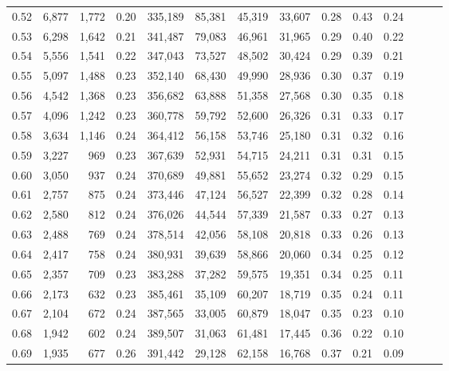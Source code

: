 \begin{tabular}{rrrrrrrrrrrrrr}
0.52 &   6,877 &  1,772 &  0.20 &  335,189 &   85,381 &  45,319 &  33,607 &  0.28 &  0.43 &      0.24 \\
0.53 &   6,298 &  1,642 &  0.21 &  341,487 &   79,083 &  46,961 &  31,965 &  0.29 &  0.40 &      0.22 \\
0.54 &   5,556 &  1,541 &  0.22 &  347,043 &   73,527 &  48,502 &  30,424 &  0.29 &  0.39 &      0.21 \\
0.55 &   5,097 &  1,488 &  0.23 &  352,140 &   68,430 &  49,990 &  28,936 &  0.30 &  0.37 &      0.19 \\
0.56 &   4,542 &  1,368 &  0.23 &  356,682 &   63,888 &  51,358 &  27,568 &  0.30 &  0.35 &      0.18 \\
0.57 &   4,096 &  1,242 &  0.23 &  360,778 &   59,792 &  52,600 &  26,326 &  0.31 &  0.33 &      0.17 \\
0.58 &   3,634 &  1,146 &  0.24 &  364,412 &   56,158 &  53,746 &  25,180 &  0.31 &  0.32 &      0.16 \\
0.59 &   3,227 &    969 &  0.23 &  367,639 &   52,931 &  54,715 &  24,211 &  0.31 &  0.31 &      0.15 \\
0.60 &   3,050 &    937 &  0.24 &  370,689 &   49,881 &  55,652 &  23,274 &  0.32 &  0.29 &      0.15 \\
0.61 &   2,757 &    875 &  0.24 &  373,446 &   47,124 &  56,527 &  22,399 &  0.32 &  0.28 &      0.14 \\
0.62 &   2,580 &    812 &  0.24 &  376,026 &   44,544 &  57,339 &  21,587 &  0.33 &  0.27 &      0.13 \\
0.63 &   2,488 &    769 &  0.24 &  378,514 &   42,056 &  58,108 &  20,818 &  0.33 &  0.26 &      0.13 \\
0.64 &   2,417 &    758 &  0.24 &  380,931 &   39,639 &  58,866 &  20,060 &  0.34 &  0.25 &      0.12 \\
0.65 &   2,357 &    709 &  0.23 &  383,288 &   37,282 &  59,575 &  19,351 &  0.34 &  0.25 &      0.11 \\
0.66 &   2,173 &    632 &  0.23 &  385,461 &   35,109 &  60,207 &  18,719 &  0.35 &  0.24 &      0.11 \\
0.67 &   2,104 &    672 &  0.24 &  387,565 &   33,005 &  60,879 &  18,047 &  0.35 &  0.23 &      0.10 \\
0.68 &   1,942 &    602 &  0.24 &  389,507 &   31,063 &  61,481 &  17,445 &  0.36 &  0.22 &      0.10 \\
0.69 &   1,935 &    677 &  0.26 &  391,442 &   29,128 &  62,158 &  16,768 &  0.37 &  0.21 &      0.09 \\

\end{tabular}
